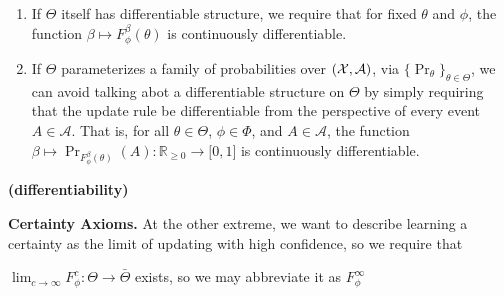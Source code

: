 \documentclass{article}
\begin{document}
\begin{CFaxioms}
    \item \label{ax:diffble}
    \begin{enumerate}
    \item If $\Theta$ itself has differentiable structure, we require that
        for fixed $\theta$ and $\phi$, the function $\beta \mapsto F^{\beta}_\phi(\theta)$
        is continuously differentiable. %
    \item If $\Theta$ parameterizes a family of probabilities over $(\mathcal X, \mathcal A)$,
        via $\{ \Pr_\theta \}_{\theta \in \Theta}$, we can avoid talking abot a differentiable structure on $\Theta$ by simply requiring that the update rule be differentiable from the perspective of every event $A \in \mathcal A$.
        That is,
        for all $\theta \in \Theta$, $\phi \in \Phi$, and  $A \in \mathcal A$,
        the function $\beta \mapsto \Pr_{F^{\beta}_\phi(\theta)}(A)
        : \mathbb R_{\ge 0} \to \mathbb [0,1]$ is
        continuously differentiable.
            \label{ax:diffble2}
    \end{enumerate}
    \hfill \textbf{(differentiability)}
\end{CFaxioms}


\textbf{Certainty Axioms.}
At the other extreme, we want to describe learning a certainty as the limit of updating with high confidence, so we require that
\begin{CFaxioms}
    \item
        $\displaystyle\lim_{c \to \infty} F^{c}_\phi : \Theta \to \bar\Theta$
        exists, so we may abbreviate it as $F^\infty_\phi$
        \label{ax:cert-exists}
\end{CFaxioms}
\end{document}
